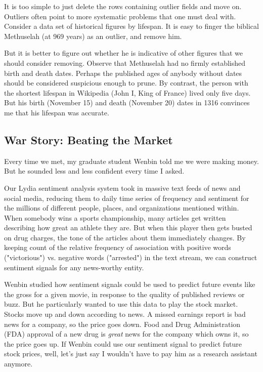\documentclass[10pt]{article}
\begin{document}
It is too simple to just delete the rows containing outlier fields and move on. Outliers often point to more systematic problems that one must deal with. Consider a data set of historical figures by lifespan. It is easy to finger the biblical Methuselah (at 969 years) as an outlier, and remove him.

But it is better to figure out whether he is indicative of other figures that we should consider removing. Observe that Methuselah had no firmly established birth and death dates. Perhaps the published ages of anybody without dates should be considered suspicious enough to prune. By contrast, the person with the shortest lifespan in Wikipedia (John I, King of France) lived only five days. But his birth (November 15) and death (November 20) dates in 1316 convinces me that his lifespan was accurate.

\subsection{War Story: Beating the Market}

Every time we met, my graduate student Wenbin told me we were making money. But he sounded less and less confident every time I asked.

Our Lydia sentiment analysis system took in massive text feeds of news and social media, reducing them to daily time series of frequency and sentiment for the millions of different people, places, and organizations mentioned within. When somebody wins a sports championship, many articles get written describing how great an athlete they are. But when this player then gets busted on drug charges, the tone of the articles about them immediately changes. By keeping count of the relative frequency of association with positive words ("victorious") vs. negative words ("arrested") in the text stream, we can construct sentiment signals for any news-worthy entity.

Wenbin studied how sentiment signals could be used to predict future events like the gross for a given movie, in response to the quality of published reviews or buzz. But he particularly wanted to use this data to play the stock market. Stocks move up and down according to news. A missed earnings report is bad news for a company, so the price goes down. Food and Drug Administration (FDA) approval of a new drug is \textit{great} news for the company which owns it, so the price goes up. If Wenbin could use our sentiment signal to predict future stock prices, well, let's just say I wouldn't have to pay him as a research assistant anymore.
\end{document}
